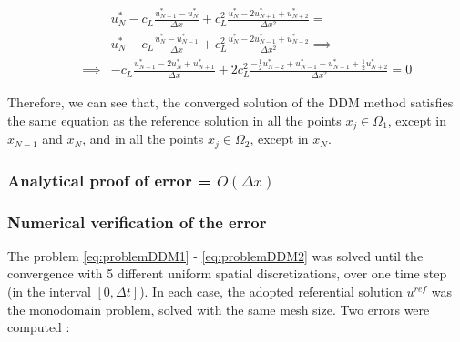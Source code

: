 \begin{equation}
    \label{eq:TBCsCVOmega2}
\begin{aligned}
   && 					&	 u_N^* -  c_L\frac{u_{N+1}^* - u_{N}^*}{\Delta x} + c_L^2 \frac{u_{N}^* - 2u_{N+1}^* + u_{N+2}^*}{\Delta x^2} =  \\
   && 					& u_N^* -  c_L\frac{u_{N}^* - u_{N-1}^*}{\Delta x} + c_L^2 \frac{u_{N}^* - 2u_{N-1}^* + u_{N-2}^*}{\Delta x^2} \implies \\
	&&  \implies	    & -c_L\frac{u_{N-1}^* - 2 u_{N}^* + u_{N+1}^*}{\Delta x} + 2c_L^2\frac{-\frac{1}{2}u_{N-2}^* + u_{N-1}^* - u_{N+1}^* + \frac{1}{2}u_{N+2}^* }{\Delta x^2} = 0 
\end{aligned}
\end{equation}

\indent Therefore, we can see that, the converged solution of the DDM method satisfies the same equation as the reference solution in all the points $x_j \in \Omega_1$, except in $x_{N-1}$ and $x_N$, and in all the points $x_j \in \Omega_2$, except in $x_N$.


%

\subsubsection{Analytical proof of error = $O(\Delta x)$}

\subsubsection{Numerical verification of the error}

\indent The problem \eqref{eq:problemDDM1} - \eqref{eq:problemDDM2} was solved until the convergence with 5 different uniform spatial discretizations, over one time step (in the interval $[0,\Delta t]$). In each case, the adopted referential solution $u^{ref}$ was the monodomain problem, solved with the same mesh size. Two errors were computed : 

